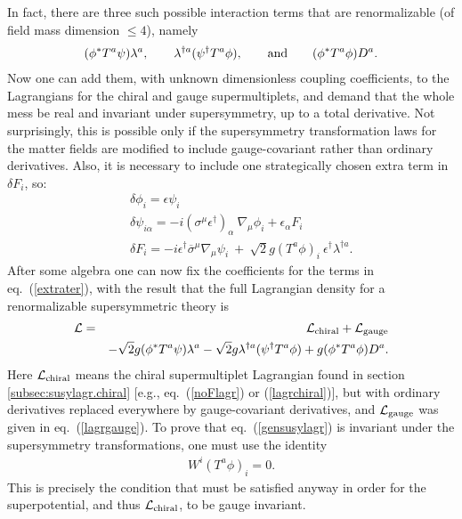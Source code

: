 \documentclass[11pt]{article}
\def\beq{\begin{eqnarray}}
\def\eeq{\end{eqnarray}}
\def\lagr{{\cal L}}
\def\deltaeps{\delta}
\def\sigmabar{\overline\sigma}
\begin{document}
In fact, there are three such possible interaction terms that are
renormalizable (of field mass dimension $\leq 4$), namely
\beq
(\phi^* T^a \psi)\lambda^a,\qquad
\lambda^{\dagger a} (\psi^\dagger T^a
\phi),
\qquad {\rm and} \qquad
(\phi^* T^a \phi) D^a .
\label{extrater}
\eeq
Now one can add them, with unknown dimensionless coupling coefficients, to
the Lagrangians for the chiral and gauge supermultiplets, and demand that
the whole mess be real and invariant under supersymmetry,
up to a total derivative. Not surprisingly, this is possible only if the
supersymmetry transformation laws for the matter fields are modified to
include gauge-covariant rather than ordinary derivatives. Also, it is
necessary to include one strategically chosen extra term in $\delta F_i$,
so: 
\beq
&&
\delta \phi_i = \epsilon\psi_i
\label{gphitran}\\
&&\delta \psi_{i\alpha} =
-i (\sigma^\mu \epsilon^\dagger)_{\alpha}\> \nabla_\mu\phi_i + \epsilon_\alpha F_i
\\
&&\deltaeps F_i = -i \epsilon^\dagger \sigmabar^\mu \nabla_\mu \psi_i
\> + \> \sqrt{2} g (T^a \phi)_i\> \epsilon^\dagger \lambda^{\dagger a} .
\eeq
After some algebra one can now fix the coefficients for the terms in
eq.~(\ref{extrater}), with the result that the full Lagrangian density
for a renormalizable supersymmetric theory is
\beq
\lagr & = & \lagr_{\rm chiral} + \lagr_{\rm gauge} 
\nonumber\\
        && - \sqrt{2} g 
(\phi^* T^a \psi)\lambda^a 
- \sqrt{2} g\lambda^{\dagger a} (\psi^\dagger T^a \phi)
+ g  (\phi^* T^a \phi) D^a .
\label{gensusylagr}
\eeq
Here $\lagr_{\rm chiral }$ means the chiral supermultiplet Lagrangian
found in section \ref{subsec:susylagr.chiral} [e.g., eq.~(\ref{noFlagr})
or (\ref{lagrchiral})], but with ordinary derivatives replaced everywhere
by gauge-covariant derivatives, and $\lagr_{\rm gauge}$ was given in
eq.~(\ref{lagrgauge}). To prove that eq.~(\ref{gensusylagr}) is invariant
under the supersymmetry transformations, one must use the identity
\beq
W^i (T^a \phi)_i = 0.
\label{wgaugeinvar}
\eeq 
This is precisely the condition that must be satisfied anyway in order for
the superpotential, and thus $\lagr_{\rm chiral}$, to be gauge invariant.
\end{document}
